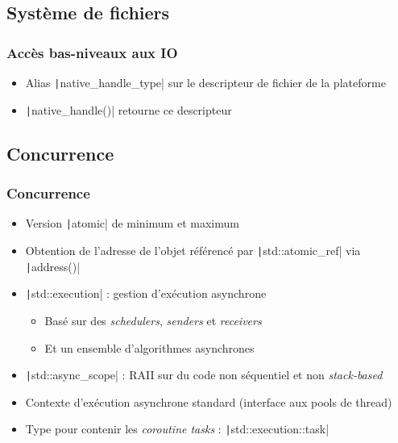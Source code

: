 \documentclass[C++.tex]{subfiles}
\begin{document}
\subsection*{Système de fichiers}
\begin{frame}[fragile]
	\frametitle{Accès bas-niveaux aux IO}
	\begin{itemize}
		\item Alias \texttt|native_handle_type| sur le descripteur de fichier de la plateforme
		\item \texttt|native_handle()| retourne ce descripteur
	\end{itemize}

\end{frame}

\subsection*{Concurrence}
\begin{frame}[fragile]
	\frametitle{Concurrence}
	\begin{itemize}
		\item Version \texttt|atomic| de minimum et maximum
		\item Obtention de l'adresse de l'objet référencé par \texttt|std::atomic_ref| via \texttt|address()|
		\item \texttt|std::execution| : gestion d'exécution asynchrone
		\begin{itemize}
			\item Basé sur des \textit{schedulers}, \textit{senders} et \textit{receivers}
			\item Et un ensemble d'algorithmes asynchrones
		\end{itemize}
		\item \texttt|std::async_scope| : RAII sur du code non séquentiel et non \textit{stack-based}
		\item Contexte d'exécution asynchrone standard (interface aux pools de thread)
		\item Type pour contenir les \textit{coroutine tasks} : \texttt|std::execution::task|
	\end{itemize}

\end{frame}
\end{document}
